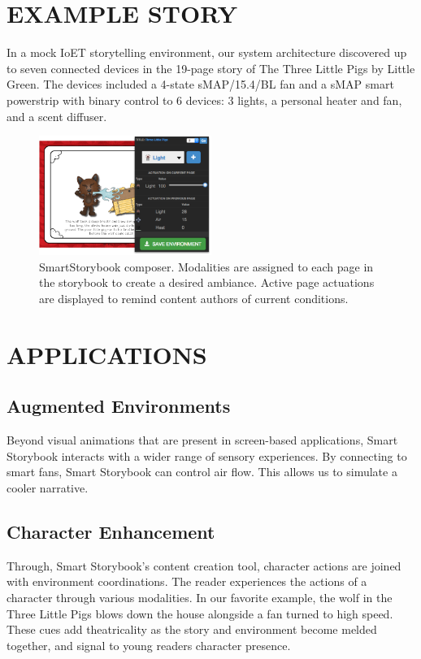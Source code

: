 \documentclass{sigchi}
\newcommand\namesp{SmartStorybook }
\begin{document}
\section{EXAMPLE STORY}
In a mock IoET storytelling environment, our system architecture discovered up to seven connected devices in the 19-page story of The Three Little Pigs by Little Green. The devices included a 4-state sMAP/15.4/BL fan and a sMAP smart powerstrip with binary control to 6 devices: 3 lights, a personal heater and fan, and a scent diffuser.  
  \begin{figure}[t!]
      \centering
      \includegraphics[keepaspectratio, width=0.5\textwidth]{figures/composer.pdf} 
      \caption{\namesp composer. Modalities are assigned to each page in the storybook to create a desired ambiance. Active page actuations are displayed to remind content authors of current conditions.}
      \vspace{-4pt}
      \label{fig:composer} 
    \end{figure}



\section{APPLICATIONS}
\subsection{Augmented Environments}
Beyond visual animations that are present in screen-based applications, Smart Storybook interacts with a wider range of sensory experiences. By connecting to smart fans, Smart Storybook can control air flow. This allows us to simulate a cooler narrative.
\subsection{Character Enhancement}
Through, Smart Storybook's content creation tool, character actions are joined with environment coordinations. The reader experiences the actions of a character through various modalities. In our favorite example, the wolf in the Three Little Pigs blows down the house alongside a fan turned to high speed. These cues add theatricality as the story and environment become melded together, and signal to young readers character presence. 
\end{document}
